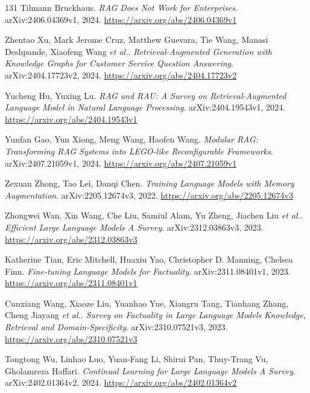 \documentclass[11pt,a4paper]{article}
\begin{document}
\begin{thebibliography}{131}
Tilmann Bruckhaus.
\newblock \emph{RAG Does Not Work for Enterprises}.
\newblock arXiv:2406.04369v1, 2024.
\newblock \url{https://arxiv.org/abs/2406.04369v1}

Zhentao Xu, Mark Jerome Cruz, Matthew Guevara, Tie Wang, Manasi Deshpande, Xiaofeng Wang \emph{et al.}.
\newblock \emph{Retrieval-Augmented Generation with Knowledge Graphs for Customer Service Question Answering}.
\newblock arXiv:2404.17723v2, 2024.
\newblock \url{https://arxiv.org/abs/2404.17723v2}

Yucheng Hu, Yuxing Lu.
\newblock \emph{RAG and RAU: A Survey on Retrieval-Augmented Language Model in Natural Language Processing}.
\newblock arXiv:2404.19543v1, 2024.
\newblock \url{https://arxiv.org/abs/2404.19543v1}

Yunfan Gao, Yun Xiong, Meng Wang, Haofen Wang.
\newblock \emph{Modular RAG: Transforming RAG Systems into LEGO-like Reconfigurable Frameworks}.
\newblock arXiv:2407.21059v1, 2024.
\newblock \url{https://arxiv.org/abs/2407.21059v1}

Zexuan Zhong, Tao Lei, Danqi Chen.
\newblock \emph{Training Language Models with Memory Augmentation}.
\newblock arXiv:2205.12674v3, 2022.
\newblock \url{https://arxiv.org/abs/2205.12674v3}

Zhongwei Wan, Xin Wang, Che Liu, Samiul Alam, Yu Zheng, Jiachen Liu \emph{et al.}.
\newblock \emph{Efficient Large Language Models A Survey}.
\newblock arXiv:2312.03863v3, 2023.
\newblock \url{https://arxiv.org/abs/2312.03863v3}

Katherine Tian, Eric Mitchell, Huaxiu Yao, Christopher D. Manning, Chelsea Finn.
\newblock \emph{Fine-tuning Language Models for Factuality}.
\newblock arXiv:2311.08401v1, 2023.
\newblock \url{https://arxiv.org/abs/2311.08401v1}

Cunxiang Wang, Xiaoze Liu, Yuanhao Yue, Xiangru Tang, Tianhang Zhang, Cheng Jiayang \emph{et al.}.
\newblock \emph{Survey on Factuality in Large Language Models Knowledge, Retrieval and Domain-Specificity}.
\newblock arXiv:2310.07521v3, 2023.
\newblock \url{https://arxiv.org/abs/2310.07521v3}

Tongtong Wu, Linhao Luo, Yuan-Fang Li, Shirui Pan, Thuy-Trang Vu, Gholamreza Haffari.
\newblock \emph{Continual Learning for Large Language Models A Survey}.
\newblock arXiv:2402.01364v2, 2024.
\newblock \url{https://arxiv.org/abs/2402.01364v2}


\end{thebibliography}
\end{document}
